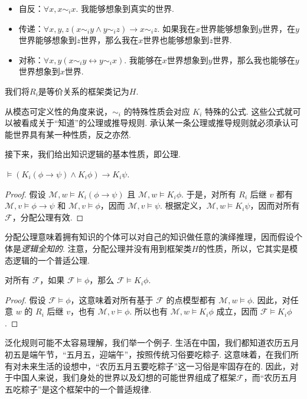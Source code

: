 \begin{itemize}
    \item 自反：$\forall x,x\sim_ix$. 我能够想象到真实的世界. 
    \item 传递：$\forall x,y,z(x\sim_iy\wedge y\sim_iz)\to x\sim_iz$. 如果我在$x$世界能够想象到$y$世界，在$y$世界能够想象到$z$世界，那么我在$x$世界也能够想象到$z$世界. 
    \item 对称：$\forall x,y(x \sim_i y\leftrightarrow y\sim_ix)$. 我能够在$x$世界想象到$y$世界，那么我也能够在$y$世界想象到$x$世界. 
\end{itemize}
我们将$R_i$是等价关系的框架类记为$H$. 

从模态可定义性的角度来说，$\sim_i$ 的特殊性质会对应 $K_i$ 特殊的公式. 这些公式就可以被看成关于“知道”的公理或推导规则. 承认某一条公理或推导规则就必须承认可能世界具有某一种性质，反之亦然. 

接下来，我们给出知识逻辑的基本性质，即公理. 

\begin{proposition}[分配公理]
$\vDash (K_i(\phi\to\psi)\wedge K_i\phi)\to K_i\psi$.
\end{proposition}

\begin{proof}
假设 $\mathcal M,w\vDash K_i(\phi\to\psi)$ 且 $\mathcal M,w\vDash K_i \phi$. 于是，对所有 $R_i$ 后继 $v$ 都有 $\mathcal M,v\vDash\phi\to\psi$ 和 $\mathcal M,v\vDash\phi$，因而 $\mathcal M,v\vDash\psi$. 根据定义，$\mathcal M,w\vDash K_i\psi$，因而对所有 $\mathcal F$，分配公理有效. 
\end{proof}

分配公理意味着拥有知识的个体可以对自己的知识做任意的演绎推理，因而假设个体是\textit{逻辑全知的}. 注意，分配公理并没有用到框架类$H$的性质，所以，它其实是模态逻辑的一个普适公理. 

\begin{proposition}[泛化规则]
对所有 $\mathcal F$，如果 $\mathcal F\vDash\phi$，那么 $\mathcal F\vDash K_i\phi$. 
\end{proposition}

\begin{proof}
假设 $\mathcal F\vDash\phi$，这意味着对所有基于 $\mathcal F$ 的点模型都有 $\mathcal M,w\vDash\phi$. 因此，对任意 $w$ 的 $R_i$ 后继 $v$，也有 $\mathcal M,v\vDash\phi$. 所以也有 $\mathcal M,w\vDash K_i\phi$ 成立，因而 $\mathcal F\vDash K_i\phi$. 
\end{proof}


泛化规则可能不太容易理解，我们举一个例子. 生活在中国，我们都知道农历五月初五是端午节，“五月五，迎端午”，按照传统习俗要吃粽子. 这意味着，在我们所有对未来生活的设想中，“农历五月五要吃粽子”这一习俗是牢固存在的. 因此，对于中国人来说，我们身处的世界以及幻想的可能世界组成了框架$\mathcal F$，而“农历五月五吃粽子”是这个框架中的一个普适规律. 

